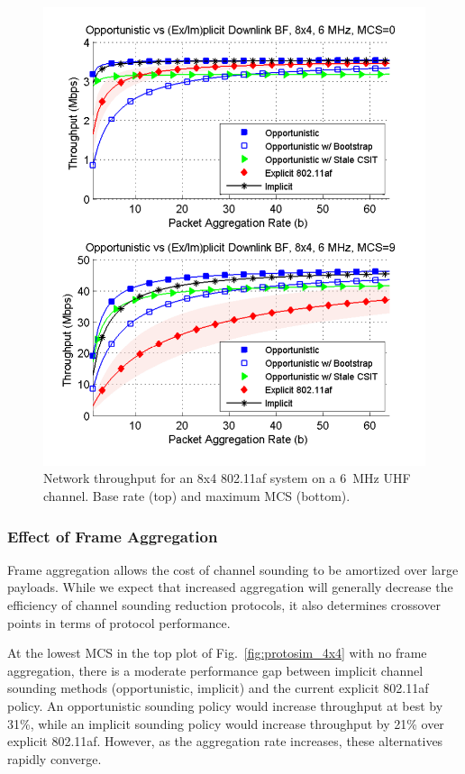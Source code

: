 \begin{figure}[t] %
\centering
\includegraphics[width=0.7\linewidth]{./figs/protocol/tput_vs_agg_8x4_6mhz_im_mcs-0}
\caption{Network throughput for an 8x4 802.11af system on a 6~MHz UHF channel. Base rate (top) and maximum \ac{MCS} (bottom).}
\label{fig_protosim_8x8}
\end{figure}

\subsubsection{Effect of Frame Aggregation}
	Frame aggregation allows the cost of channel sounding to be amortized over large payloads. While we expect that increased aggregation will generally decrease the efficiency of channel sounding reduction protocols, it also determines crossover points in terms of protocol performance.
	
	At the lowest \ac{MCS} in the top plot of Fig.~\ref{fig:protosim_4x4} with no frame aggregation, there is a moderate performance gap between implicit channel sounding methods (opportunistic, implicit) and the current explicit 802.11af policy.
	An opportunistic sounding policy would increase throughput at best by 31\%, while an implicit sounding policy would increase throughput by 21\% over explicit 802.11af.
	However, as the aggregation rate increases, these alternatives rapidly converge. %
	
